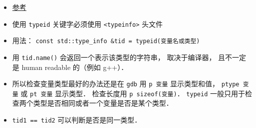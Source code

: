 
\begin{issues}
\issueDraft
\end{issues}

\begin{itemize}
\item \href{https://en.cppreference.com/w/cpp/language/typeid}{参考}
\item 使用 \verb|typeid| 关键字必须使用 \verb|<typeinfo>| 头文件
\item 用法： \verb|const std::type_info &tid = typeid(变量名或类型)|
\item 用 \verb|tid.name()| 会返回一个表示该类型的字符串， 取决于编译器， 且不一定是 human readable 的（例如 g++）．
\item 所以检查变量类型最好的办法还是在 \verb|gdb| 用 \verb|p 变量| 显示类型和值， \verb|ptype 变量| 或 \verb|pt 变量| 显示类型． 检查长度用 \verb|p sizeof(变量)|． \verb|typeid| 一般只用于检查两个类型是否相同或者一个变量是否是某个类型．
\item \verb|tid1 == tid2| 可以判断是否是同一类型．
\end{itemize}
